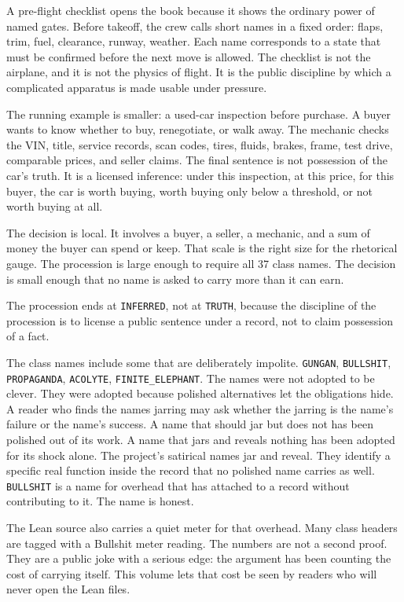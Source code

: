 A pre-flight checklist opens the book because it shows the ordinary
power of named gates. Before takeoff, the crew calls short names in a
fixed order: flaps, trim, fuel, clearance, runway, weather. Each name
corresponds to a state that must be confirmed before the next move is
allowed. The checklist is not the airplane, and it is not the physics of
flight. It is the public discipline by which a complicated apparatus is
made usable under pressure.

The running example is smaller: a used-car inspection before purchase.
A buyer wants to know whether to buy, renegotiate, or walk away. The
mechanic checks the VIN, title, service records, scan codes, tires,
fluids, brakes, frame, test drive, comparable prices, and seller claims.
The final sentence is not possession of the car's truth. It is a
licensed inference: under this inspection, at this price, for this
buyer, the car is worth buying, worth buying only below a threshold, or
not worth buying at all.

The decision is local. It involves a buyer, a seller, a mechanic, and a
sum of money the buyer can spend or keep. That scale is the right size
for the rhetorical gauge. The procession is large enough to require all
37 class names. The decision is small enough that no name is asked to
carry more than it can earn.

The procession ends at \texttt{INFERRED}, not at \texttt{TRUTH},
because the discipline of the procession is to license a public sentence
under a record, not to claim possession of a fact.

The class names include some that are deliberately impolite.
\texttt{GUNGAN}, \texttt{BULLSHIT}, \texttt{PROPAGANDA},
\texttt{ACOLYTE}, \texttt{FINITE\_ELEPHANT}. The names were not adopted
to be clever. They were adopted because polished alternatives let the
obligations hide. A reader who finds the names jarring may ask whether
the jarring is the name's failure or the name's success. A name that
should jar but does not has been polished out of its work. A name that
jars and reveals nothing has been adopted for its shock alone. The
project's satirical names jar and reveal. They identify a specific real
function inside the record that no polished name carries as well.
\texttt{BULLSHIT} is a name for overhead that has attached to a record
without contributing to it. The name is honest.

The Lean source also carries a quiet meter for that overhead. Many class
headers are tagged with a Bullshit meter reading. The numbers are not a
second proof. They are a public joke with a serious edge: the argument
has been counting the cost of carrying itself. This volume lets that
cost be seen by readers who will never open the Lean files.

